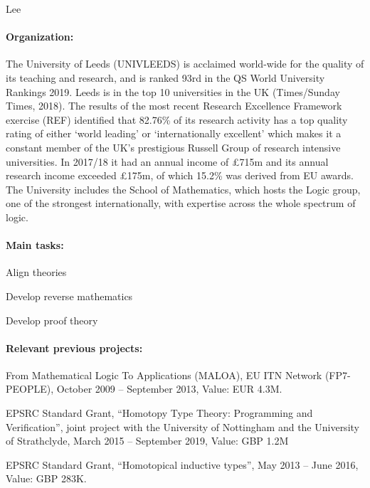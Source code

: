 \begin{sitedescription}{Lee}

\paragraph*{Organization:} The University of Leeds (UNIVLEEDS) is acclaimed world-wide for the quality of its teaching and research, and is ranked 93rd in the QS World University Rankings 2019. Leeds is in the top 10 universities in the UK (Times/Sunday Times, 2018). The results of the most recent Research Excellence Framework exercise (REF) identified that 82.76\% 
of its research activity has a top quality rating of either `world leading' or `internationally excellent' which makes it a constant member of the UK's prestigious Russell Group of research intensive universities. 
In 2017/18 it had an annual income of \pounds 715m and its annual research income exceeded \pounds 175m, of which 15.2\% was derived from EU awards. The University includes the School of Mathematics,
which hosts the Logic group, one of the strongest internationally, with expertise across the whole
spectrum of logic. 




\paragraph*{Main tasks:}

\begin{compactitem}
\item Align theories
\item Develop reverse mathematics
\item Develop proof theory
\end{compactitem}




\paragraph*{Relevant previous projects:}

\begin{compactitem}
\item From Mathematical Logic To Applications (MALOA), EU ITN Network (FP7-PEOPLE), October 2009 -- September 2013, Value: EUR 4.3M.
\item EPSRC Standard Grant, ``Homotopy Type Theory: Programming and Verification'', joint project with the University of Nottingham and the University of Strathclyde, March 2015 -- September 2019, Value: GBP 1.2M
\item EPSRC Standard Grant, ``Homotopical inductive types'', May 2013 -- June 2016, Value: GBP 283K.
\end{compactitem}


\end{sitedescription}

